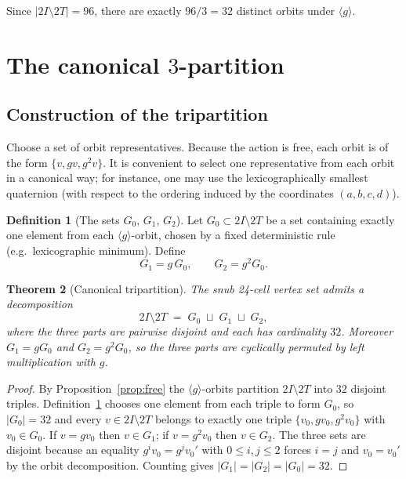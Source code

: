 \documentclass[10pt,reqno]{amsart}
\theoremstyle{plain}
\newtheorem{theorem}{Theorem}[section]
\theoremstyle{definition}
\newtheorem{definition}[theorem]{Definition}
\begin{document}
Since $|2I \setminus 2T| = 96$, there are exactly $96/3 = 32$ distinct orbits under $\langle g \rangle$.

\section{The canonical $3$-partition}\label{sec:partition}

\subsection{Construction of the tripartition}

Choose a set of orbit representatives. Because the action is free, each orbit is of the form $\{v, gv, g^2 v\}$. It is convenient to select one representative from each orbit in a canonical way; for instance, one may use the lexicographically smallest quaternion (with respect to the ordering induced by the coordinates $(a,b,c,d)$).

\begin{definition}[The sets $G_0$, $G_1$, $G_2$]\label{def:partition}
Let $G_0 \subset 2I \setminus 2T$ be a set containing exactly one element from each $\langle g \rangle$-orbit, chosen by a fixed deterministic rule (e.g.\ lexicographic minimum). Define
\begin{equation}
G_1 = g\,G_0, \qquad G_2 = g^2 G_0.
\end{equation}
\end{definition}

\begin{theorem}[Canonical tripartition]\label{thm:main}
The snub 24-cell vertex set admits a decomposition
\begin{equation}\label{eq:main}
2I \setminus 2T \;=\; G_0 \;\sqcup\; G_1 \;\sqcup\; G_2,
\end{equation}
where the three parts are pairwise disjoint and each has cardinality $32$. Moreover $G_1 = g G_0$ and $G_2 = g^2 G_0$, so the three parts are cyclically permuted by left multiplication with $g$.
\end{theorem}

\begin{proof}
By Proposition~\ref{prop:free} the $\langle g \rangle$-orbits partition $2I \setminus 2T$ into $32$ disjoint triples. Definition~\ref{def:partition} chooses one element from each triple to form $G_0$, so $|G_0| = 32$ and every $v \in 2I \setminus 2T$ belongs to exactly one triple $\{v_0, gv_0, g^2 v_0\}$ with $v_0 \in G_0$. If $v = gv_0$ then $v \in G_1$; if $v = g^2 v_0$ then $v \in G_2$. The three sets are disjoint because an equality $g^i v_0 = g^j v_0'$ with $0 \le i,j \le 2$ forces $i=j$ and $v_0 = v_0'$ by the orbit decomposition. Counting gives $|G_1| = |G_2| = |G_0| = 32$.
\end{proof}
\end{document}
